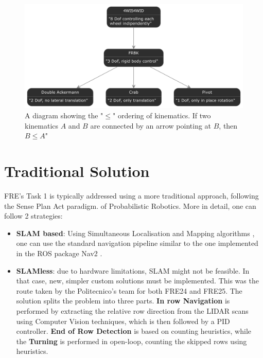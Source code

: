 \documentclass[11pt,a4paper,twocolumn]{article}
\begin{document}
\begin{figure}
    \centering
    \includegraphics[width=1\linewidth]{Multidisciplinary_Project_Report/Images/poset.png}
    \caption{A diagram showing the "$\leq$" ordering of kinematics. If two kinematics $A$ and $B$ are connected by an arrow pointing at $B$, then $B \leq A$"}
    \label{fig:poset}
\end{figure}

\section{Traditional Solution}
FRE's Task 1 is typically addressed using a more traditional approach, following the Sense Plan Act paradigm. of Probabilistic Robotics. More in detail, one can follow 2 strategies:
\begin{itemize}
    \item \textbf{SLAM based}: Using Simultaneous Localisation and Mapping algorithms \cite{DurrantWhyte2006SimultaneousLA} \cite{ProbabilisticRobotics}, one can use the standard navigation pipeline similar to the one implemented in the ROS package Nav2 \cite{nav2}.
    \item \textbf{SLAMless}: due to hardware limitations, SLAM might not be feasible. In that case, new, simpler custom solutions must be implemented. This was the route taken by the Politecnico's team for both FRE24 and FRE25. The solution splits the problem into three parts. \textbf{In row Navigation} is performed by extracting the relative row direction from the LIDAR scans using Computer Vision techniques, which is then followed by a PID controller. \textbf{End of Row Detection} is based on counting heuristics, while the \textbf{Turning} is performed in open-loop, counting the skipped rows using heuristics. 
\end{itemize}
\end{document}
